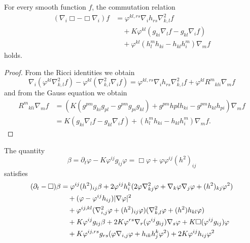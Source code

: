 \documentclass{amsart}
\begin{document}
\begin{lemma}
\label{lem:gradBox}
For every smooth function $f$, the commutation relation
\[
\begin{split}
(\nabla_i \Box -\Box \nabla_i) f &= \varphi^{kl,rs} \nabla_i h_{rs} \nabla^2_{k,l} f \\
&\quad + K \varphi^{kl} \left(g_{ki} \nabla_l f - g_{kl} \nabla_i f\right) \\
&\quad + \varphi^{kl}\left(h^{m}_{l}h_{ki} - h_{kl}h^{m}_{i}\right) \nabla_m f
\end{split}
\]
holds.
\end{lemma}

\begin{proof}
From the Ricci identities we obtain
\[
\nabla_i (\varphi^{kl} \nabla^2_{k,l} f) - \varphi^{kl}(\nabla^2_{k,l} \nabla_i f) = \varphi^{kl,rs} \nabla_i h_{rs} \nabla^2_{k,l}f + \varphi^{kl}{R^{m}}_{kli} \nabla_m f
\]
and from the Gauss equation we obtain
\[
\begin{split}
{R^{m}}_{kli} \nabla_m f &= \left(K\left(g^{pm}g_{ki}g_{pl}  - g^{pm}g_{pi}g_{kl}\right) + g^{pm} h{pl}h_{ki} - g^{pm}h_{kl}h_{pi}\right) \nabla_m f \\
&= K\left(g_{ki} \nabla_l f - g_{kl} \nabla_i f\right) + \left(h^{m}_{l}h_{ki} - h_{kl}h^{m}_{i}\right) \nabla_m f.
\end{split}
\]
\end{proof}

\begin{lemma}
\label{lem:evbeta}
The quantity 
\[
\beta = \partial_t \varphi - K\varphi^{ij}g_{ij}\varphi = \Box\varphi +  \varphi\varphi^{ij} (h^2)_{ij}
\]
satisfies
\[
\begin{split}
(\partial_{t} - \Box)\beta &= \varphi^{ij}(h^2)_{ij}\beta + 2\varphi^{ij}h^{k}_{i} (2\varphi\nabla^2_{kj}\varphi + \nabla_k \varphi \nabla_j \varphi + (h^2)_{kj}\varphi^{2}) \\
&\quad + (\varphi - \varphi^{ij}h_{ij}) |\nabla\varphi|^{2} \\
&\quad + \varphi^{ij,kl} (\nabla^2_{i,j}\varphi + (h^2)_{ij}\varphi) (\nabla^2_{k,l} \varphi + (h^2)h_{kl}\varphi) \\
&\quad + K\varphi^{ij}g_{ij} \beta + 2K\varphi^{rs} \nabla_r (\varphi^{ij}g_{ij}) \nabla_s \varphi + K\Box (\varphi^{ij}g_{ij}) \varphi \\
&\quad + K\varphi^{ij,rs}g_{rs} (\varphi\nabla_{i,j}\varphi + h_{ik}h^{k}_{j}\varphi^{2}) + 2K\varphi^{ij}h_{ij}\varphi^{2}
\end{split}
\]
\end{lemma}
\end{document}
